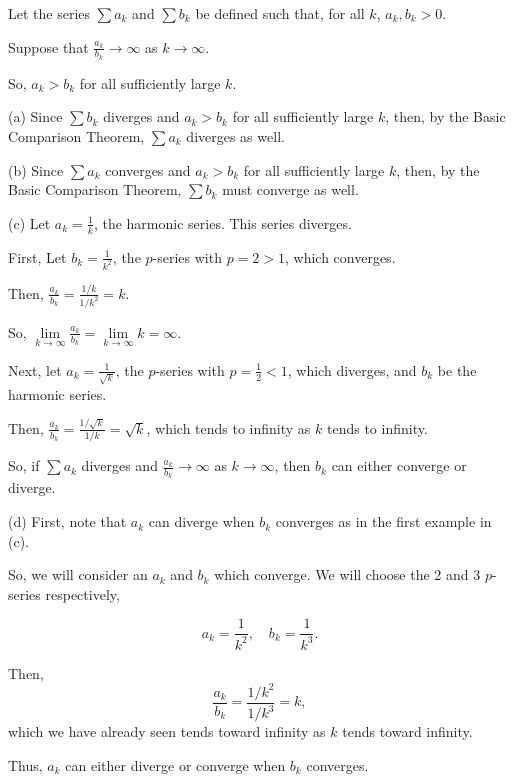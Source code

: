 \documentclass[../root file]{subfiles}
\begin{document}
Let the series $\sum a_k$ and $\sum b_k$ be defined such that, for all $k$, $a_k, b_k >0$.

Suppose that $\frac{a_k}{b_k}\to\infty$ as $k\to\infty$.

So, $a_k > b_k$ for all sufficiently large $k$.

(a) Since $\sum b_k$ diverges and $a_k>b_k$ for all sufficiently large $k$, then, by the Basic Comparison Theorem, $\sum a_k$ diverges as well.

(b) Since $\sum a_k$ converges and $a_k>b_k$ for all sufficiently large $k$, then, by the Basic Comparison Theorem, $\sum b_k$ must converge as well.

(c) Let $a_k = \frac{1}{k}$, the harmonic series. This series diverges.

First, Let $b_k = \frac{1}{k^2}$, the $p$-series with $p=2>1$, which converges.

Then, $\frac{a_k}{b_k}=\frac{1/k}{1/k^2}=k$.

So, $\lim\limits_{k\to\infty}\frac{a_k}{b_k}=\lim\limits_{k\to\infty}k=\infty$.

Next, let $a_k=\frac{1}{\sqrt{k}}$, the $p$-series with $p=\frac{1}{2}<1$, which diverges, and $b_k$ be the harmonic series. 

Then, $\frac{a_k}{b_k}=\frac{1/\sqrt{k}}{1/k}=\sqrt{k}$, which tends to infinity as $k$ tends to infinity.

So, if $\sum a_k$ diverges and $\frac{a_k}{b_k}\to\infty$ as $k\to\infty$, then $b_k$ can either converge or diverge.

(d) First, note that $a_k$ can diverge when $b_k$ converges as in the first example in (c). 

So, we will consider an $a_k$ and $b_k$ which converge. We will choose the 2 and 3 $p$-series respectively, 

\[a_k=\frac{1}{k^2}, \quad b_k=\frac{1}{k^3}.\]

Then, \[\frac{a_k}{b_k}=\frac{1/k^2}{1/k^3}=k,\] which we have already seen tends toward infinity as $k$ tends toward infinity.

Thus, $a_k$ can either diverge or converge when $b_k$ converges.
\end{document}
